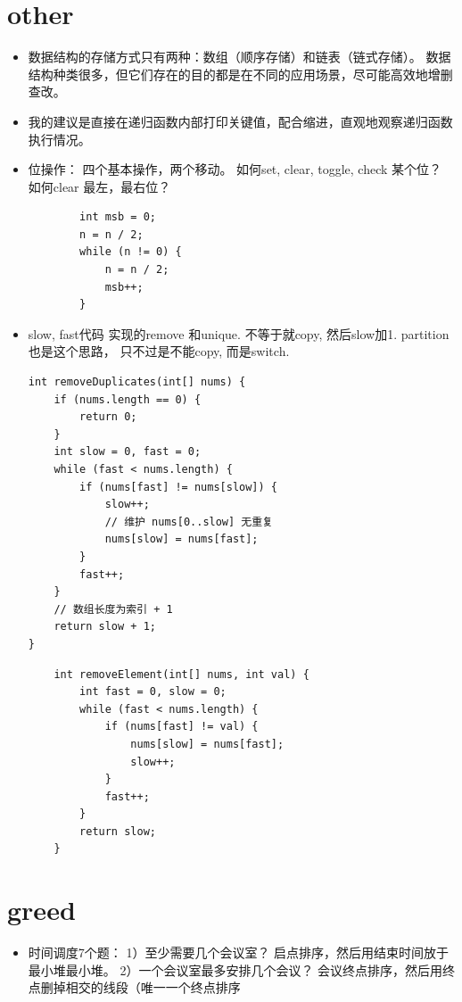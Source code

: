 \documentclass[a4paper,11pt,twoside]{book}
\begin{document}
\begin{itemize}

\section{other}
\begin{itemize}
	\item 	数据结构的存储方式只有两种：数组（顺序存储）和链表（链式存储）。 数据结构种类很多，但它们存在的目的都是在不同的应用场景，尽可能高效地增删查改。
	
	\item 	我的建议是直接在递归函数内部打印关键值，配合缩进，直观地观察递归函数执行情况。
	
	\item 位操作： 四个基本操作，两个移动。 如何set, clear, toggle, check 某个位？ 如何clear 最左，最右位？ 
	
	\begin{lstlisting}
		int msb = 0;
		n = n / 2;
		while (n != 0) {
			n = n / 2;
			msb++;
		}
	\end{lstlisting}

\item slow, fast代码 实现的remove 和unique.  不等于就copy, 然后slow加1. partition 也是这个思路， 只不过是不能copy, 而是switch. 
	\begin{lstlisting}
int removeDuplicates(int[] nums) {
	if (nums.length == 0) {
		return 0;
	}
	int slow = 0, fast = 0;
	while (fast < nums.length) {
		if (nums[fast] != nums[slow]) {
			slow++;
			// 维护 nums[0..slow] 无重复
			nums[slow] = nums[fast];
		}
		fast++;
	}
	// 数组长度为索引 + 1
	return slow + 1;
}
	\end{lstlisting}

	\begin{lstlisting}
	int removeElement(int[] nums, int val) {
		int fast = 0, slow = 0;
		while (fast < nums.length) {
			if (nums[fast] != val) {
				nums[slow] = nums[fast];
				slow++;
			}
			fast++;
		}
		return slow;
	}
\end{lstlisting}

\end{itemize}
	

\section{greed}
\begin{itemize}

\item 时间调度7个题： 1）至少需要几个会议室？ 启点排序，然后用结束时间放于最小堆最小堆。 2）一个会议室最多安排几个会议？ 会议终点排序，然后用终点删掉相交的线段（唯一一个终点排序


\end{itemize}
\end{itemize}
\end{document}
